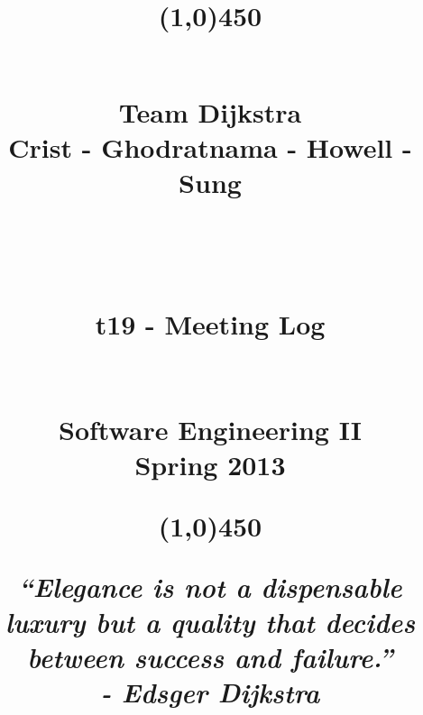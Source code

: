 \documentclass[11pt, letterpaper]{report}
\begin{document}
\title{\begin{center}
\line(1,0){450}
\end{center} \hfill \\ \Huge{Team Dijkstra }\\ \small{Crist - Ghodratnama - Howell - Sung} \\ \hfill \\ \hfill \\ \hfill \\ \huge{t19 - Meeting Log}  \\ \hfill \\ \hfill  \\ \Large{Software Engineering II} \\ \small{Spring 2013} \\ \begin{center}
\line(1,0){450}
\end{center}\small{\textit{``Elegance is not a dispensable luxury but a quality that decides between success and failure.'' \\- Edsger Dijkstra}}}
\date{ }

\maketitle
\newpage
\end{document}
